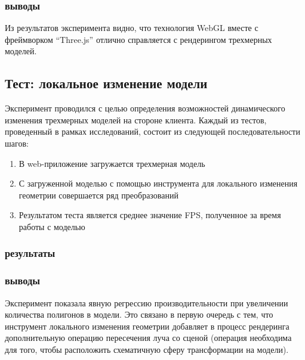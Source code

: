 \documentclass[14pt, a4paper]{extarticle}
\begin{document}
\subsubsection{выводы}

Из результатов эксперимента видно, что технология WebGL вместе с фреймворком
``Three.js'' отлично справляется с рендерингом трехмерных моделей.

\subsection{Тест: локальное изменение модели}

Эксперимент проводился с целью определения возможностей динамического
изменения трехмерных моделей на стороне клиента. Каждый из тестов, проведенный в
рамках исследований, состоит из следующей последовательности шагов:

\begin{enumerate}
    \item В web-приложение загружается трехмерная модель
    \item С загруженной моделью с помощью инструмента для локального изменения
    геометрии совершается ряд преобразований
    \item Результатом теста является среднее значение FPS, полученное за время
    работы с моделью
\end{enumerate}

\subsubsection{результаты}
\begin{center}
\end{center}

\subsubsection{выводы}

Эксперимент показала явную регрессию производительности при увеличении
количества полигонов в модели. Это связано в первую очередь с тем, что
инструмент локального изменения геометрии добавляет в процесс рендеринга
дополнительную операцию пересечения луча со сценой (операция необходима для
того, чтобы расположить схематичную сферу трансформации на модели).
\end{document}

